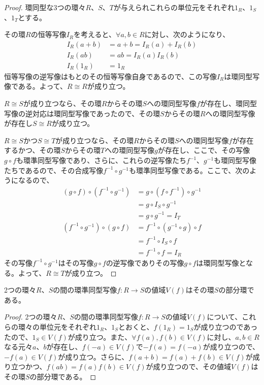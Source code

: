 \documentclass[dvipdfmx]{jsarticle}
\begin{document}
\begin{proof}
環同型な3つの環々$R$、$S$、$T$が与えられこれらの単位元をそれぞれ$1_{R}$、$1_{S}$、$1_{T}$とする。\par
その環$R$の恒等写像$I_{R}$を考えると、$\forall a,b \in R$に対し、次のようになり、
\begin{align*}
I_{R}(a + b) &= a + b = I_{R}(a) + I_{R}(b)\\
I_{R}(ab) &= ab = I_{R}(a)I_{R}(b)\\
I_{R}\left( 1_{R} \right) &= 1_{R}
\end{align*}
恒等写像の逆写像はもとのその恒等写像自身であるので、この写像$I_{R}$は環同型写像である。よって、$R \cong R$が成り立つ。\par
$R \cong S$が成り立つなら、その環$R$からその環$S$への環同型写像$f$が存在し、環同型写像の逆対応は環同型写像であったので、その環$S$からその環$R$への環同型写像が存在し$S \cong R$が成り立つ。\par
$R \cong S$かつ$S \cong T$が成り立つなら、その環$R$からその環$S$への環同型写像$f$が存在するかつ、その環$S$からその環$T$への環同型写像$g$が存在し、ここで、その写像$g \circ f$も環準同型写像であり、さらに、これらの逆写像たち$f^{- 1}$、$g^{- 1}$も環同型写像たちであるので、その合成写像$f^{- 1} \circ g^{- 1}$も環準同型写像である。ここで、次のようになるので、
\begin{align*}
(g \circ f) \circ \left( f^{- 1} \circ g^{- 1} \right) &= g \circ \left( f \circ f^{- 1} \right) \circ g^{- 1}\\
&= g \circ I_{S} \circ g^{- 1}\\
&= g \circ g^{- 1} = I_{T}\\
\left( f^{- 1} \circ g^{- 1} \right) \circ (g \circ f) &= f^{- 1} \circ \left( g^{- 1} \circ g \right) \circ f\\
&= f^{- 1} \circ I_{S} \circ f\\
&= f^{- 1} \circ f = I_{R}
\end{align*}
その写像$f^{- 1} \circ g^{- 1}$はその写像$g \circ f$の逆写像でありその写像$g \circ f$は環同型写像となる。よって、$R \cong T$が成り立つ。
\end{proof}
\begin{thm}\label{3.3.2.17}
2つの環々$R$、$S$の間の環準同型写像$f:R \rightarrow S$の値域$V(f)$はその環$S$の部分環である。
\end{thm}
\begin{proof}
2つの環々$R$、$S$の間の環準同型写像$f:R \rightarrow S$の値域$V(f)$について、これらの環々の単位元をそれぞれ$1_{R}$、$1_{S}$とおくと、$f\left( 1_{R} \right) = 1_{S}$が成り立つのであったので、$1_{S} \in V(f)$が成り立つ。また、$\forall f(a),f(b) \in V(f)$に対し、$a,b \in R$なる元々$a$、$b$が存在し、$f( - a) \in V(f)$で$- f(a) = f( - a)$が成り立つので、$- f(a) \in V(f)$が成り立つ。さらに、$f(a + b) = f(a) + f(b) \in V(f)$が成り立つかつ、$f(ab) = f(a)f(b) \in V(f)$が成り立つので、その値域$V(f)$はその環$S$の部分環である。
\end{proof}
\end{document}
